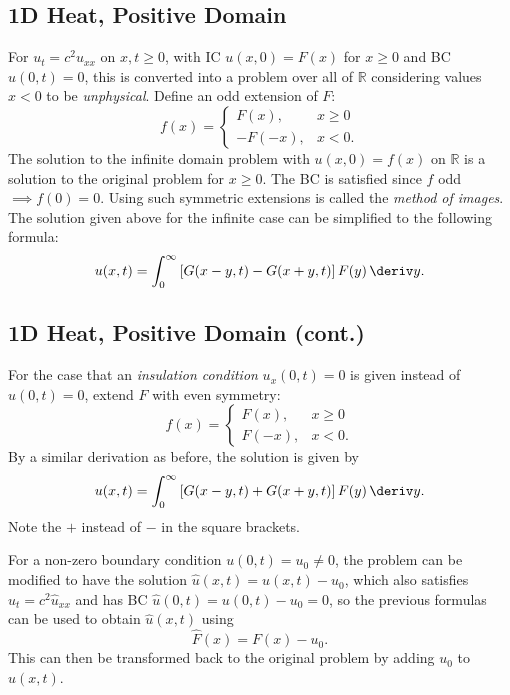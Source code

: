\documentclass[10pt, a4paper]{article}
\begin{document}
\begin{landscape}
\begin{multicols*}{2}
    \section{1D Heat, Positive Domain}

    For \(u_t = c^2 u_{xx}\) on \(x, t \geq 0\), with IC \(u(x, 0) = F(x)\) for \(x \geq 0\) and BC
    \(u(0, t) = 0\), this is converted into a problem over all of \(\mathbb{R}\) considering
    values \(x < 0\) to be \emph{unphysical}. Define an odd extension of \(F\):
    \[
        f(x) = \begin{cases}
            F(x), & x \geq 0 \\
            -F(-x), & x < 0.
        \end{cases}
    \]
    The solution to the infinite domain problem with \(u(x, 0) = f(x)\) on \(\mathbb{R}\) is a solution to the
    original problem for \(x \geq 0\). The BC is satisfied since \(f\) odd \(\implies f(0) = 0\).
    Using such symmetric extensions is called the \emph{method of images}.
    The solution given above for the infinite case can be simplified to the following formula:
    \[
        u(x, t) = \int_0^{\infty} \left[G(x-y, t) - G(x+y, t)\right] F(y) \,\deriv y.
    \]

\end{multicols*}

\pagebreak

\begin{multicols*}{2}

    \section{1D Heat, Positive Domain (cont.)}

    For the case that an \emph{insulation condition} \(u_x(0, t) = 0\) is given instead of \(u(0, t) = 0\),
    extend \(F\) with even symmetry:
    \[
        f(x) = \begin{cases}
            F(x), & x \geq 0 \\
            F(-x), & x < 0.
        \end{cases}
    \]
    By a similar derivation as before, the solution is given by
    \[
        u(x, t) = \int_0^{\infty} \left[G(x-y, t) + G(x+y, t)\right] F(y) \,\deriv y.
    \]
    Note the \(+\) instead of \(-\) in the square brackets.

    For a non-zero boundary condition \(u(0, t) = u_0 \neq 0\), the problem can be modified
    to have the solution \(\hat u(x, t) = u(x, t) - u_0\), which also satisfies \(\hat u_t = c^2 \hat u_{xx}\)
    and has BC \(\hat u(0, t) = u(0, t) - u_0 = 0\), so the previous formulas can be used to obtain \(\hat u(x, t)\)
    using
    \[
        \hat F(x) = F(x) - u_0.
    \]
    This can then be transformed back to the original problem by adding \(u_0\) to \(\hat u(x, t)\).


\end{multicols*}
\end{landscape}
\end{document}
